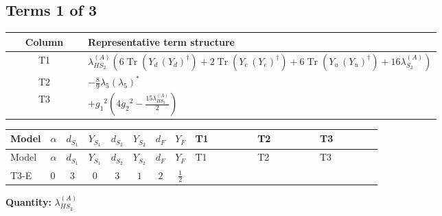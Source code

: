 \documentclass[8pt]{article}
\begin{document}
\begin{landscape}
\subsection*{Terms 1 of 3}
\begin{center}
\begin{tabular}{@{}c >{\raggedright\arraybackslash}p{0.82\linewidth}@{}}
\toprule
Column & Representative term structure \\
\midrule
T1 & \(\displaystyle {\lambda_{HS_2}^{(A)}} (6 \operatorname{Tr}\!\left({Y_d}\,\left({Y_d}\right)^{\dagger}\right)+2 \operatorname{Tr}\!\left({Y_e}\,\left({Y_e}\right)^{\dagger}\right)+6 \operatorname{Tr}\!\left({Y_u}\,\left({Y_u}\right)^{\dagger}\right)+16 {\lambda_{S_2}^{(A)}})\) \\
\midrule
T2 & \(\displaystyle -\frac{8}{9} {\lambda_5} \left({\lambda_5}\right)^{*}\) \\
\midrule
T3 & \(\displaystyle +{g_1}^2 \left(4 {g_2}^2-\frac{15 {\lambda_{HS_2}^{(A)}}}{2}\right)\) \\
\midrule
\bottomrule
\end{tabular}
\end{center}
\smallskip
\tiny
\begin{longtable}{@{}llcccccc >{\raggedright\arraybackslash}p{0.21\linewidth} >{\raggedright\arraybackslash}p{0.21\linewidth} >{\raggedright\arraybackslash}p{0.21\linewidth}@{}}
\toprule
Model & $\alpha$ & $d_{S_1}$ & $Y_{S_1}$ & $d_{S_2}$ & $Y_{S_2}$ & $d_F$ & $Y_F$ & T1 & T2 & T3 \\
\midrule
\endfirsthead
\toprule
Model & $\alpha$ & $d_{S_1}$ & $Y_{S_1}$ & $d_{S_2}$ & $Y_{S_2}$ & $d_F$ & $Y_F$ & T1 & T2 & T3 \\
\midrule
\endhead
T3-E & $0$ & $3$ & $0$ & $3$ & $1$ & $2$ & $\frac{1}{2}$ & \scriptsize\adjustbox{max width=\linewidth}{$\begin{gathered} {\lambda_{HS_2}^{(A)}} (6 \operatorname{Tr}\!\left({Y_d}\,\left({Y_d}\right)^{\dagger}\right)+2 \operatorname{Tr}\!\left({Y_e}\,\left({Y_e}\right)^{\dagger}\right)+6 \operatorname{Tr}\!\left({Y_u}\,\left({Y_u}\right)^{\dagger}\right)+16 {\lambda_{S_2}^{(A)}})\end{gathered}$} & \scriptsize\adjustbox{max width=\linewidth}{$\begin{gathered} -\frac{8}{9} {\lambda_5} \left({\lambda_5}\right)^{*}\end{gathered}$} & \scriptsize\adjustbox{max width=\linewidth}{$\begin{gathered} +{g_1}^2 \left(4 {g_2}^2-\frac{15 {\lambda_{HS_2}^{(A)}}}{2}\right)\end{gathered}$} \\
\midrule
\bottomrule
\end{longtable}
\clearpage
\noindent\textbf{Quantity: }$\lambda_{HS_2}^{(A)}$\par\smallskip

\end{landscape}
\end{document}
